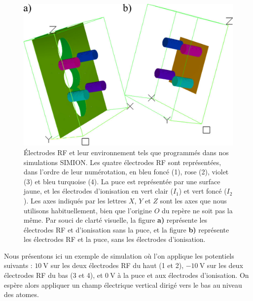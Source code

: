 \newpage
\begin{figure}
\centering
\includegraphics[width=1\linewidth]{figures/circulars/RF_electrodes_Simion}
\caption[Électrodes de circularisation et de contrôle du champ parallèle]{
Électrodes \og RF \fg{} et leur environnement tels que programmés dans nos simulations SIMION.
Les quatre électrodes RF sont représentées, dans l'ordre de leur numérotation, en bleu foncé (1), rose (2), violet (3) et bleu turquoise (4).
La puce est représentée par une surface jaune, et les électrodes d'ionisation en vert clair ($I_1$) et vert foncé ($I_2$).
Les axes indiqués par les lettres $X$, $Y$ et $Z$ sont les axes que nous utilisons habituellement, bien que l'origine $O$ du repère ne soit pas la même.
Par souci de clarté visuelle, la figure \textbf{a)} représente les électrodes RF et d'ionisation sans la puce, et la figure \textbf{b)} représente les électrodes RF et la puce, sans les électrodes d'ionisation.
}
\label{fig:RF_elec_SIMION}
\end{figure}
%

\clearpage
Nous présentons ici un exemple de simulation où l'on applique les potentiels suivants :
$\SI{+10}{\V}$ sur les deux électrodes RF du haut (1 et 2), $\SI{-10}{\V}$ sur les deux électrodes RF du bas (3 et 4), et $\SI{0}{\V}$ à la puce et aux électrodes d'ionisation.
On espère alors appliquer un champ électrique vertical dirigé vers le bas au niveau des atomes.

